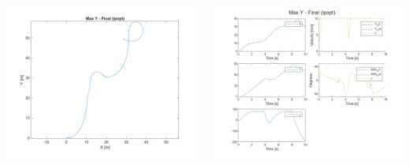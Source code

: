 \documentclass[aspectratio=169]{beamer}
\begin{document}
\begin{frame}
\begin{columns}
\begin{column}{0.25\textwidth}
			\includegraphics[width = \columnwidth]{figs/Max_Y_-_Final_(ipopt)_quiver.png}
		\end{column}
		\begin{column}{0.4\textwidth}
			\includegraphics[width = \columnwidth]{figs/Max_Y_-_Final_(ipopt)_traj.png}			
		\end{column}
	\end{columns}
\end{frame}
\end{document}
